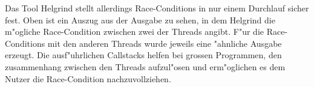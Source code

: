 Das Tool Helgrind stellt allerdings Race-Conditions in nur einem Durchlauf sicher fest. Oben ist ein Auszug aus der Ausgabe zu sehen, in dem Helgrind die m"ogliche Race-Condition zwischen zwei der Threads angibt. F"ur die Race-Conditions mit den anderen Threads wurde jeweils eine "ahnliche Ausgabe erzeugt.
Die ausf"uhrlichen Callstacks helfen bei grossen Programmen, den zusammenhang zwischen den Threads aufzul"osen und erm"oglichen es dem Nutzer die Race-Condition nachzuvollziehen.